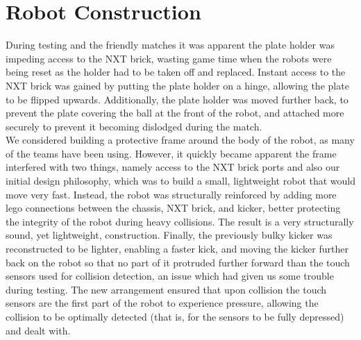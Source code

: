 \documentclass[conference,12pt]{IEEEtran}
\begin{document}
\section{Robot Construction}	
During testing and the friendly matches it was apparent the plate holder was impeding access to the NXT brick, wasting game time when the robots were being reset as the holder had to be taken off and replaced. Instant access to the NXT brick was gained by putting the plate holder on a hinge, allowing the plate to be flipped upwards. Additionally, the plate holder was moved further back, to prevent the plate covering the ball at the front of the robot, and attached more securely to prevent it becoming dislodged during the match. \\
We considered building a protective frame around the body of the robot, as many of the teams have been using. However, it quickly became apparent the frame interfered with two things, namely access to the NXT brick ports and also our initial design philosophy, which was to build a small, lightweight robot that would move very fast. Instead, the robot was structurally reinforced by adding more lego connections between the chassis, NXT brick, and kicker, better protecting the integrity of the robot during heavy collisions. The result is a very structurally sound, yet lightweight, construction. Finally, the previously bulky kicker was reconstructed to be lighter, enabling a faster kick, and moving the kicker further back on the robot so that no part of it protruded further forward than the touch sensors used for collision detection, an issue which had given us some trouble during testing. The new arrangement ensured that upon collision the touch sensors are the first part of the robot to experience pressure, allowing the collision to be optimally detected (that is, for the sensors to be fully depressed) and dealt with.
\end{document}
